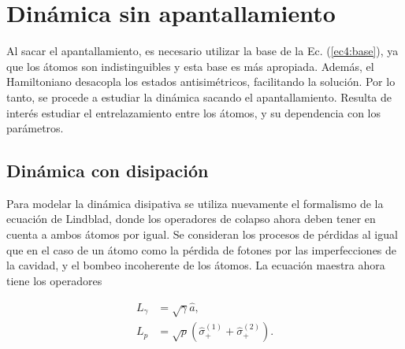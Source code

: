 \section{Dinámica sin apantallamiento}
\label{sec4:dinamica sin apantallamiento}

Al sacar el apantallamiento, es necesario utilizar la base de la Ec. (\ref{ec4:base}), ya que los átomos son indistinguibles y esta base es más apropiada. Además, el Hamiltoniano desacopla los estados antisimétricos, facilitando la solución. Por lo tanto, se procede a estudiar la dinámica sacando el apantallamiento. Resulta de interés estudiar el entrelazamiento entre los átomos, y su dependencia con los parámetros. 

\subsection{Dinámica con disipación}
Para modelar la dinámica disipativa se utiliza nuevamente el formalismo de la ecuación de Lindblad, donde los operadores de colapso ahora deben tener en cuenta a ambos átomos por igual. Se consideran los procesos de pérdidas al igual que en el caso de un átomo como la pérdida de fotones por las imperfecciones de la cavidad, y el bombeo incoherente de los átomos. La ecuación maestra ahora tiene los operadores

\begin{align}
    L_\gamma&=\sqrt{\gamma}\hat a, \\
    L_p &=\sqrt{p}(\hat\sigma_+^{(1)}+\hat\sigma_+^{(2)}).  
\end{align}

